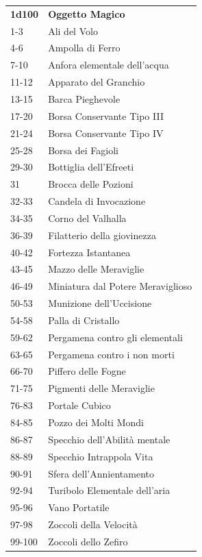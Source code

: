 \begin{multicols}{2}
	\begin{tabularx}{0.45\textwidth}{lX}
		\textbf{1d100} & \textbf{Oggetto Magico}\\
		1-3 &Ali del Volo\\
		4-6 &Ampolla di Ferro\\
		7-10 &Anfora elementale dell’acqua\\
		11-12& Apparato del Granchio\\
		13-15& Barca Pieghevole\\
		17-20& Borsa Conservante Tipo III\\
		21-24& Borsa Conservante Tipo IV\\
		25-28& Borsa dei Fagioli\\
		29-30& Bottiglia dell'Efreeti\\
		31 &Brocca delle Pozioni\\
		32-33& Candela di Invocazione\\
		34-35 &Corno del Valhalla\\
		36-39 &Filatterio della giovinezza\\
		40-42 &Fortezza Istantanea\\
		43-45 &Mazzo delle Meraviglie\\
		46-49 &Miniatura dal Potere Meraviglioso\\
		50-53 &Munizione dell'Uccisione\\
		54-58 &Palla di Cristallo\\
		59-62 &Pergamena contro gli elementali\\
		63-65 &Pergamena contro i non morti\\
		66-70 &Piffero delle Fogne\\
		71-75 &Pigmenti delle Meraviglie\\
		76-83 &Portale Cubico\\
		84-85 &Pozzo dei Molti Mondi\\
		86-87 &Specchio dell’Abilità mentale\\
		88-89 &Specchio Intrappola Vita\\
		90-91 &Sfera dell'Annientamento\\
		92-94 &Turibolo Elementale dell’aria\\
		95-96 &Vano Portatile\\
		97-98 &Zoccoli della Velocità\\
		99-100 &Zoccoli dello Zefiro\\
	\end{tabularx}

	\medskip


\end{multicols}
